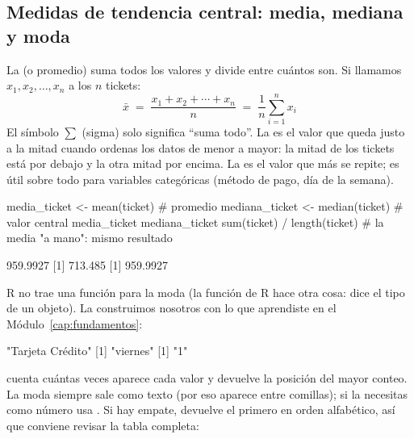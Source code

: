 \subsection{Medidas de tendencia central: media, mediana y moda}

La  (o promedio) suma todos los valores y divide entre cuántos
son. Si llamamos $x_1, x_2, \ldots, x_n$ a los $n$ tickets:
\[
  \bar{x} \;=\; \frac{x_1 + x_2 + \cdots + x_n}{n}
          \;=\; \frac{1}{n}\sum_{i=1}^{n} x_i
\]
El símbolo $\sum$ (sigma) solo significa ``suma todo''. La 
es el valor que queda justo a la mitad cuando ordenas los datos de menor a
mayor: la mitad de los tickets está por debajo y la otra mitad por encima. La
 es el valor que más se repite; es útil sobre todo para
variables categóricas (método de pago, día de la semana).

\begin{rcode}
media_ticket   <- mean(ticket)     # promedio
mediana_ticket <- median(ticket)   # valor central
media_ticket
mediana_ticket
sum(ticket) / length(ticket)       # la media "a mano": mismo resultado
\end{rcode}
\begin{rsalida}
[1] 959.9927
[1] 713.485
[1] 959.9927
\end{rsalida}

R no trae una función para la moda (la función  de R hace otra
cosa: dice el tipo de un objeto). La construimos nosotros con lo que
aprendiste en el Módulo~\ref{cap:fundamentos}:

\begin{rsalida}
[1] "Tarjeta Crédito"
[1] "viernes"
[1] "1"
\end{rsalida}

 cuenta cuántas veces aparece cada valor y
 devuelve la posición del mayor conteo. La moda siempre
sale como texto (por eso  aparece entre comillas); si la
necesitas como número usa . Si hay empate,
 devuelve el primero en orden alfabético, así que
conviene revisar la tabla completa:

